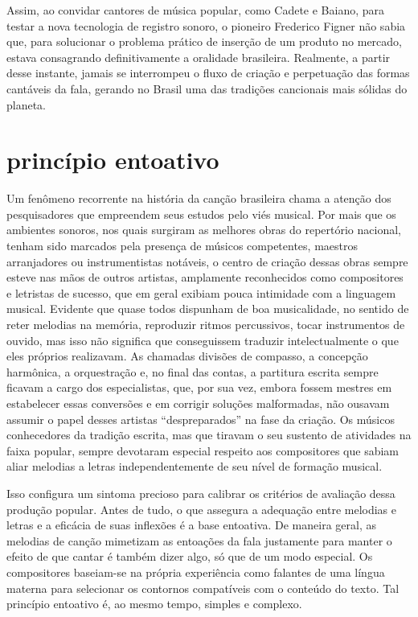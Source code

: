 Assim, ao convidar cantores de música popular, como Cadete e Baiano,
para testar a nova tecnologia de registro sonoro, o pioneiro Frederico
Figner não sabia que, para solucionar o problema prático de inserção de
um produto no mercado, estava consagrando definitivamente a oralidade
brasileira. Realmente, a partir desse instante, jamais se interrompeu o
fluxo de criação e perpetuação das formas cantáveis da fala, gerando no
Brasil uma das tradições cancionais mais sólidas do planeta.

\section{princípio entoativo}

Um fenômeno recorrente na história da canção brasileira chama a atenção
dos pesquisadores que empreendem seus estudos pelo viés musical. Por
mais que os ambientes sonoros, nos quais surgiram as melhores obras do
repertório nacional, tenham sido marcados pela presença de músicos
competentes, maestros arranjadores ou instrumentistas notáveis, o centro
de criação dessas obras sempre esteve nas mãos de outros artistas,
amplamente reconhecidos como compositores e letristas de sucesso, que em
geral exibiam pouca intimidade com a linguagem musical. Evidente que
quase todos dispunham de boa musicalidade, no sentido de reter melodias
na memória, reproduzir ritmos percussivos, tocar instrumentos de ouvido,
mas isso não significa que conseguissem traduzir intelectualmente o que
eles próprios realizavam. As chamadas divisões de compasso, a concepção
harmônica, a orquestração e, no final das contas, a partitura escrita
sempre ficavam a cargo dos especialistas, que, por sua vez, embora
fossem mestres em estabelecer essas conversões e em corrigir soluções
malformadas, não ousavam assumir o papel desses artistas
``despreparados'' na fase da criação. Os músicos conhecedores da
tradição escrita, mas que tiravam o seu sustento de atividades na faixa
popular, sempre devotaram especial respeito aos compositores que sabiam
aliar melodias a letras independentemente de seu nível de formação
musical.

Isso configura um sintoma precioso para calibrar os critérios de
avaliação dessa produção popular. Antes de tudo, o que assegura a
adequação entre melodias e letras e a eficácia de suas inflexões é a
base entoativa. De maneira geral, as melodias de canção mimetizam as
entoações da fala justamente para manter o efeito de que cantar é também
dizer algo, só que de um modo especial. Os compositores baseiam-se na
própria experiência como falantes de uma língua materna para selecionar
os contornos compatíveis com o conteúdo do texto. Tal princípio
entoativo é, ao mesmo tempo, simples e complexo.

